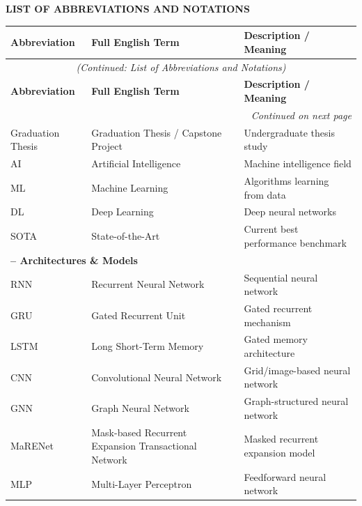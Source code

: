 
\thispagestyle{empty}

\begin{center}
    {\bfseries\LARGE LIST OF ABBREVIATIONS AND NOTATIONS}
\end{center}\vspace{1em}

\begingroup
\setlength\LTleft{0pt}    %
\setlength\LTright{0pt}   %
\small                    %

\begin{longtable}{@{}p{2cm} p{5.5cm} p{5cm}@{}}  %
\toprule
\textbf{Abbreviation} & \textbf{Full English Term} & \textbf{Description / Meaning} \\
\midrule
\endfirsthead

\multicolumn{3}{c}{\itshape (Continued: List of Abbreviations and Notations)}\\
\toprule
\textbf{Abbreviation} & \textbf{Full English Term} & \textbf{Description / Meaning} \\
\midrule
\endhead

\midrule
\multicolumn{3}{r}{\itshape Continued on next page}\\
\endfoot
\bottomrule
\endlastfoot

Graduation Thesis & Graduation Thesis / Capstone Project & Undergraduate thesis study \\
AI       & Artificial Intelligence                  & Machine intelligence field \\
ML       & Machine Learning                         & Algorithms learning from data \\
DL       & Deep Learning                            & Deep neural networks \\
SOTA     & State-of-the-Art                         & Current best performance benchmark \\[3pt]

\multicolumn{3}{l}{\textbf{– Architectures \& Models}}\\
RNN      & Recurrent Neural Network                 & Sequential neural network \\
GRU      & Gated Recurrent Unit                     & Gated recurrent mechanism \\
LSTM     & Long Short-Term Memory                   & Gated memory architecture \\
CNN      & Convolutional Neural Network             & Grid/image-based neural network \\
GNN      & Graph Neural Network                     & Graph-structured neural network \\
MaRENet  & Mask-based Recurrent Expansion Transactional Network & Masked recurrent expansion model \\
MLP      & Multi-Layer Perceptron                   & Feedforward neural network \\[3pt]


\end{longtable}
